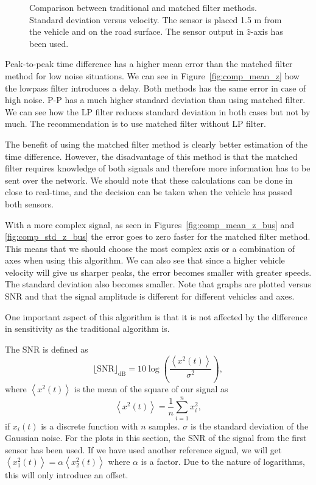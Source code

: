 \begin{subfigures}
\begin{figure}[!tbhf]
\begin{minipage}{0.45\linewidth}
  \caption[Time difference, method comparison. Error standard deviation versus velocity]{Comparison between traditional and matched filter methods. Standard deviation versus velocity. The sensor is placed 1.5 m from the vehicle and on the road surface. The sensor output in $\hat{z}$-axis has been used.}
  \label{fig:comp_std-vel}
  \end{minipage}
 \end{figure}
\end{subfigures}

Peak-to-peak time difference has a higher mean error than the matched filter method for low noise situations. We can see in \mbox{Figure \ref{fig:comp_mean_z}} how the lowpass filter introduces a delay. Both methods has the same error in case of high noise. P-P has a much higher standard deviation than using matched filter. We can see how the LP filter reduces standard deviation in both cases but not by much. The recommendation is to use matched filter without LP filter.

The benefit of using the matched filter method is clearly better estimation of the time difference. However, the disadvantage of this method is that the matched filter requires knowledge of both signals and therefore more information has to be sent over the network. We should note that these calculations can be done in close to real-time, and the decision can be taken when the vehicle has passed both sensors.

With a more complex signal, as seen in Figures~\ref{fig:comp_mean_z_bus} and \ref{fig:comp_std_z_bus} the error goes to zero faster for the matched filter method. This means that we should choose the most complex axis or a combination of axes when using this algorithm. We can also see that since a higher vehicle velocity will give us sharper peaks, the error becomes smaller with greater speeds. The standard deviation also becomes smaller. Note that graphs are plotted versus SNR and that the signal amplitude is different for different vehicles and axes.

One important aspect of this algorithm is that it is not affected by the difference in sensitivity as the traditional algorithm is.

The SNR is defined as 
\begin{equation}
 \lfloor{}\text{SNR}\rfloor_{\text{dB}} = 10 \log{\left(\frac{\left\langle{}x^2(t)\right\rangle}{\sigma^2}\right)},
\end{equation}
where $\left\langle{}x^2(t)\right\rangle$ is the mean of the square of our signal as
\begin{equation}
  \left\langle{}x^2(t)\right\rangle = \frac{1}{n} \sum_{i=1}^{n} x_i^2,
\end{equation}
 if $x_i(t)$ is a discrete function with $n$ samples. $\sigma$ is the standard deviation of the Gaussian noise. For the plots in this section, the SNR of the signal from the first sensor has been used. If we have used another reference signal, we will get $\left\langle{}x_1^2(t)\right\rangle = \alpha\left\langle{}x_2^2(t)\right\rangle$ where $\alpha$ is a factor. Due to the nature of logarithms, this will only introduce an offset.

